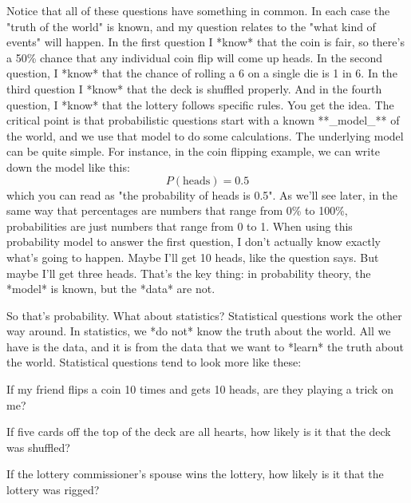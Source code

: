 Notice that all of these questions have something in common. In each case the "truth of the world" is known, and my question relates to the "what kind of events" will happen. In the first question I *know* that the coin is fair, so there's a 50\% chance that any individual coin flip will come up heads. In the second question, I *know* that the chance of rolling a 6 on a single die is 1 in 6. In the third question I *know* that the deck is shuffled properly. And in the fourth question, I *know* that the lottery follows specific rules. You get the idea. The critical point is that probabilistic questions start with a known **_model_** of the world, and we use that model to do some calculations. The underlying model can be quite simple. For instance, in the coin flipping example, we can write down the model like this:
$$
P(\mbox{heads}) = 0.5
$$
which you can read as "the probability of heads is 0.5". As we'll see later, in the same way that percentages are numbers that range from 0\% to 100\%, probabilities are just numbers that range from 0 to 1. When using this probability model to answer the first question, I don't actually know exactly what's going to happen. Maybe I'll get 10 heads, like the question says. But maybe I'll get three heads. That's the key thing: in probability theory, the *model* is known, but the *data* are not.

So that's probability. What about statistics? Statistical questions work the other way around. In statistics, we *do not* know the truth about the world. All we have is the data, and it is from the data that we want to *learn* the truth about the world. Statistical questions tend to look more like these:
 \itemsep -2pt
\item If my friend flips a coin 10 times and gets 10 heads, are they playing a trick on me?
\item If five cards off the top of the deck are all hearts, how likely is it that the deck was shuffled? 
\item If the lottery commissioner's spouse wins the lottery, how likely is it that the lottery was rigged?



